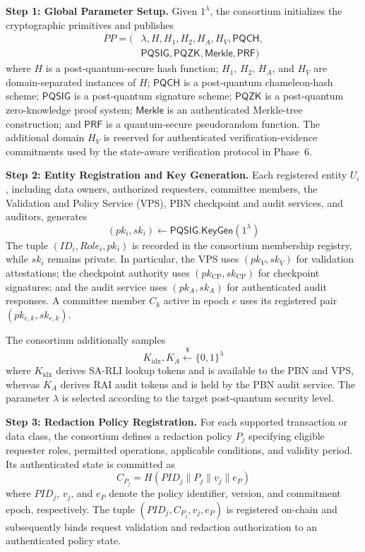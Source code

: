 \documentclass[lettersize,journal]{IEEEtran}
\begin{document}
\textbf{Step 1: Global Parameter Setup.}
Given $1^\lambda$, the consortium initializes the cryptographic
primitives and publishes
\begin{equation}
\begin{aligned}
PP=(&\lambda,H,H_1,H_2,H_A,H_V,\mathsf{PQCH},\\
&\mathsf{PQSIG},\mathsf{PQZK},\mathsf{Merkle},\mathsf{PRF})
\end{aligned}
\end{equation}
where $H$ is a post-quantum-secure hash function;
$H_1$, $H_2$, $H_A$, and $H_V$ are domain-separated instances of
$H$; $\mathsf{PQCH}$ is a post-quantum chameleon-hash scheme;
$\mathsf{PQSIG}$ is a post-quantum signature scheme;
$\mathsf{PQZK}$ is a post-quantum zero-knowledge proof system;
$\mathsf{Merkle}$ is an authenticated Merkle-tree construction; and
$\mathsf{PRF}$ is a quantum-secure pseudorandom function.
The additional domain $H_V$ is reserved for authenticated
verification-evidence commitments used by the state-aware verification
protocol in Phase~6.

\textbf{Step 2: Entity Registration and Key Generation.}
Each registered entity $U_i$, including data owners, authorized
requesters, committee members, the Validation and Policy Service
(VPS), PBN checkpoint and audit services, and auditors, generates
\begin{equation}
(pk_i,sk_i)\leftarrow
\mathsf{PQSIG.KeyGen}(1^\lambda)
\end{equation}
The tuple $(ID_i,Role_i,pk_i)$ is recorded in the consortium membership
registry, while $sk_i$ remains private. In particular, the VPS uses
$(pk_V,sk_V)$ for validation attestations; the checkpoint authority uses
$(pk_{\mathrm{CP}},sk_{\mathrm{CP}})$ for checkpoint signatures; and the
audit service uses $(pk_A,sk_A)$ for authenticated audit responses.
A committee member $C_k$ active in epoch $e$ uses its registered pair
$(pk_{e,k},sk_{e,k})$.

The consortium additionally samples
\begin{equation}
K_{\mathrm{idx}},K_A
\stackrel{\$}{\leftarrow}\{0,1\}^{\lambda}
\end{equation}
where $K_{\mathrm{idx}}$ derives SA-RLI lookup tokens and is available
to the PBN and VPS, whereas $K_A$ derives RAI audit tokens and is held
by the PBN audit service. The parameter $\lambda$ is selected according
to the target post-quantum security level.

\textbf{Step 3: Redaction Policy Registration.}
For each supported transaction or data class, the consortium defines a
redaction policy $P_j$ specifying eligible requester roles, permitted
operations, applicable conditions, and validity period. Its authenticated
state is committed as
\begin{equation}
C_{P_j}
=
H(PID_j\parallel P_j\parallel v_j\parallel e_P)
\label{eq:policy_commit}
\end{equation}
where $PID_j$, $v_j$, and $e_P$ denote the policy identifier, version,
and commitment epoch, respectively. The tuple
$(PID_j,C_{P_j},v_j,e_P)$ is registered on-chain and subsequently binds
request validation and redaction authorization to an authenticated
policy state.
\end{document}
